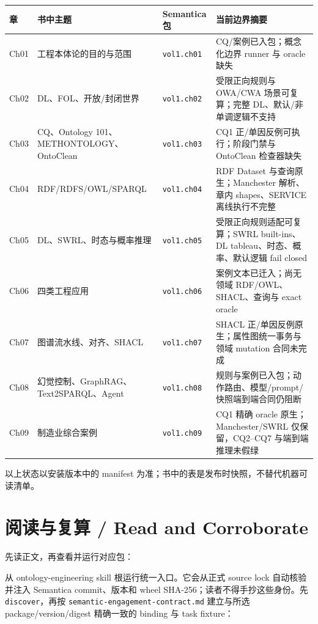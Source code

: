 \begin{center}
\begin{tabularx}{\linewidth}{@{}lXlX@{}}
\toprule
\textbf{章} & \textbf{书中主题} & \textbf{Semantica 包} & \textbf{当前边界摘要} \\
\midrule
Ch01 & 工程本体论的目的与范围 & \texttt{vol1.ch01} & CQ/案例已入包；概念化边界 runner 与 oracle 缺失 \\
Ch02 & DL、FOL、开放/封闭世界 & \texttt{vol1.ch02} & 受限正向规则与 OWA/CWA 场景可复算；完整 DL、默认/非单调逻辑不支持 \\
Ch03 & CQ、Ontology 101、METHONTOLOGY、OntoClean & \texttt{vol1.ch03} & CQ1 正/单因反例可执行；阶段门禁与 OntoClean 检查器缺失 \\
Ch04 & RDF/RDFS/OWL/SPARQL & \texttt{vol1.ch04} & RDF Dataset 与查询原生；Manchester 解析、章内 shapes、SERVICE 离线执行不完整 \\
Ch05 & DL、SWRL、时态与概率推理 & \texttt{vol1.ch05} & 受限正向规则适配可复算；SWRL built-ins、DL tableau、时态、概率、默认逻辑 fail closed \\
Ch06 & 四类工程应用 & \texttt{vol1.ch06} & 案例文本已迁入；尚无领域 RDF/OWL、SHACL、查询与 exact oracle \\
Ch07 & 图谱流水线、对齐、SHACL & \texttt{vol1.ch07} & SHACL 正/单因反例原生；属性图统一事务与领域 mutation 合同未完成 \\
Ch08 & 幻觉控制、GraphRAG、Text2SPARQL、Agent & \texttt{vol1.ch08} & 规则与案例已入包；动作路由、模型/prompt/快照端到端合同仍阻断 \\
Ch09 & 制造业综合案例 & \texttt{vol1.ch09} & CQ1 精确 oracle 原生；Manchester/SWRL 仅保留，CQ2–CQ7 与端到端推理未假绿 \\
\bottomrule
\end{tabularx}
\end{center}
\color{black}

以上状态以安装版本中的 manifest 为准；书中的表是发布时快照，不替代机器可读清单。

\section*{阅读与复算 / Read and Corroborate}

先读正文，再查看并运行对应包：

从 ontology-engineering skill 根运行统一入口。它会从正式 source lock 自动核验并注入
Semantica commit、版本和 wheel SHA-256；读者不得手抄这些身份。先 \texttt{discover}，再按
\texttt{semantic-engagement-contract.md} 建立与所选
package/version/digest 精确一致的 binding 与 task fixture：

